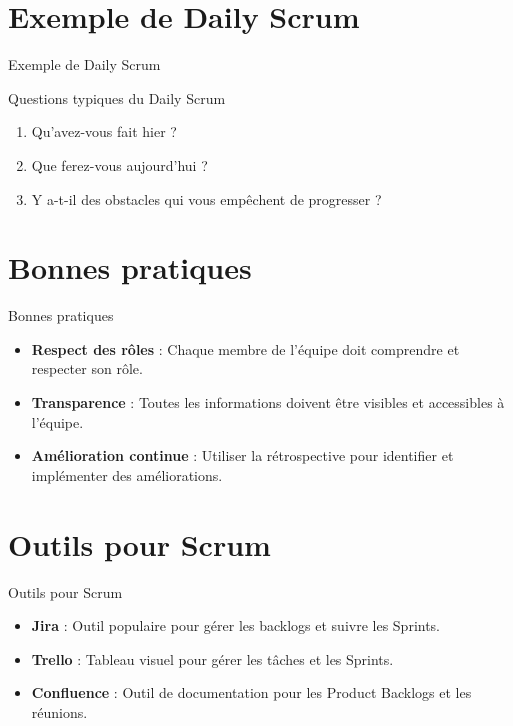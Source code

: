 \documentclass{clbeamer2024}
\begin{document}
	
	\section{Exemple de Daily Scrum}
	\begin{frame}[fragile]{Exemple de Daily Scrum}
		\begin{exampleblock}{Questions typiques du Daily Scrum}
			\begin{enumerate}
				\item Qu'avez-vous fait hier ?
				\item Que ferez-vous aujourd'hui ?
				\item Y a-t-il des obstacles qui vous empêchent de progresser ?
			\end{enumerate}
		\end{exampleblock}
	\end{frame}
	
	
	\section{Bonnes pratiques}
	\begin{frame}{Bonnes pratiques}
		\begin{itemize}
			\item \textbf{Respect des rôles} : Chaque membre de l'équipe doit comprendre et respecter son rôle.
			\item \textbf{Transparence} : Toutes les informations doivent être visibles et accessibles à l'équipe.
			\item \textbf{Amélioration continue} : Utiliser la rétrospective pour identifier et implémenter des améliorations.
		\end{itemize}
	\end{frame}
	
	
	\section{Outils pour Scrum}
	\begin{frame}{Outils pour Scrum}
		\begin{itemize}
			\item \textbf{Jira} : Outil populaire pour gérer les backlogs et suivre les Sprints.
			\item \textbf{Trello} : Tableau visuel pour gérer les tâches et les Sprints.
			\item \textbf{Confluence} : Outil de documentation pour les Product Backlogs et les réunions.
		\end{itemize}
	\end{frame}
	
\end{document}
